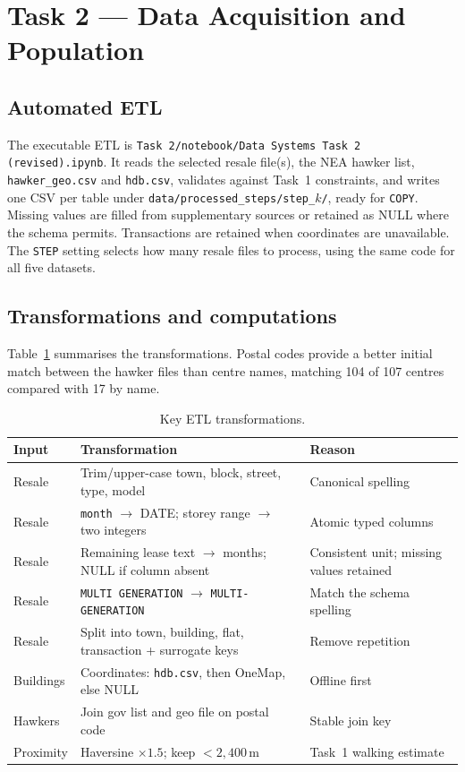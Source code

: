 \section{Task 2 --- Data Acquisition and Population}

\subsection{Automated ETL}
The executable ETL is \texttt{Task 2/notebook/Data Systems Task 2 (revised).ipynb}.
It reads the selected resale file(s), the NEA hawker list, \texttt{hawker\_geo.csv} and \texttt{hdb.csv}, validates against Task~1 constraints, and writes one CSV per table under \texttt{data/processed\_steps/step\_$k$/}, ready for \texttt{COPY}.
Missing values are filled from supplementary sources or retained as NULL where the schema permits. Transactions are retained when coordinates are unavailable.
The \texttt{STEP} setting selects how many resale files to process, using the same code for all five datasets.

\subsection{Transformations and computations}
Table~\ref{tab:etl} summarises the transformations. Postal codes provide a better initial match between the hawker files than centre names, matching 104 of 107 centres compared with 17 by name.

\begin{table}[H]
\centering
\caption{Key ETL transformations.}
\label{tab:etl}
\footnotesize
\begin{tabular}{@{}p{2.2cm}p{5.4cm}p{5.6cm}@{}}
\toprule
Input & Transformation & Reason \\
\midrule
Resale & Trim/upper-case town, block, street, type, model & Canonical spelling \\
Resale & \texttt{month} $\to$ DATE; storey range $\to$ two integers & Atomic typed columns \\
Resale & Remaining lease text $\to$ months; NULL if column absent & Consistent unit; missing values retained \\
Resale & \texttt{MULTI GENERATION} $\to$ \texttt{MULTI-GENERATION} & Match the schema spelling \\
Resale & Split into town, building, flat, transaction + surrogate keys & Remove repetition \\
Buildings & Coordinates: \texttt{hdb.csv}, then OneMap, else NULL & Offline first \\
Hawkers & Join gov list and geo file on postal code & Stable join key \\
Proximity & Haversine $\times 1.5$; keep $<2{,}400\,\mathrm{m}$ & Task~1 walking estimate \\
\bottomrule
\end{tabular}
\end{table}

